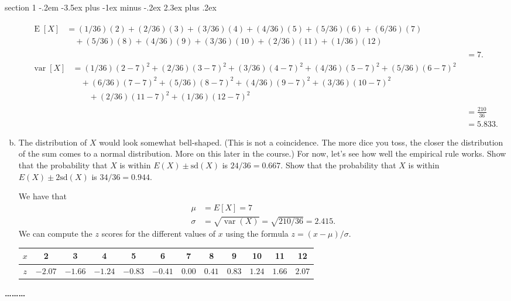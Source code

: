 \documentclass[answers,11pt]{exam}
\makeatletter
\DeclareMathOperator*{\E}{E}
\DeclareMathOperator*{\var}{var}
\newenvironment{problem}{\@startsection
       {section}
       {1}
       {-.2em}
       {-3.5ex plus -1ex minus -.2ex}
       {2.3ex plus .2ex}
       {\pagebreak[3]%
       \large\bf\noindent{Problem }
       }
       }
       {%
       \begin{center}\large\bf \ldots\ldots\ldots\end{center}}
\makeatother
\begin{document}
\begin{problem}{}
\begin{enumerate}[(a)]
\begin{solution}
\begin{align*}
\begin{split}
  \E[X] &= (1/36) (2) + (2/36) (3) + (3/36) (4) + (4/36) (5) + (5/36) (6) + (6/36) (7) \\
        &\quad+ (5/36) (8) + (4/36) (9) + (3/36) (10) + (2/36) (11) + (1/36) (12)
\end{split} \\
        &= 7. \\
\begin{split}
  \var[X] &= (1/36) (2-7)^2 + (2/36) (3-7)^2 + (3/36) (4-7)^2 + (4/36) (5-7)^2
           + (5/36) (6-7)^2 \\
        &\quad+ (6/36) (7-7)^2 + (5/36) (8-7)^2 + (4/36) (9-7)^2 + (3/36) (10-7)^2 \\
        &\quad\quad+ (2/36) (11-7)^2 + (1/36) (12-7)^2
\end{split} \\
        &= \frac{210}{36} \\
        &= 5.833.
\end{align*}
\end{solution}

\item The distribution of $X$ would look somewhat bell-shaped. (This is not a coincidence. The more
dice you toss, the closer the distribution of the sum comes to a normal
distribution. More on this later in the course.) For now, let's see how well
the empirical rule works. Show that the probability that $X$ is within 
$E(X) \pm \mathrm{sd}(X)$ is $24/36=0.667$.  
Show that the probability that $X$ is within $E(X) \pm 2\mathrm{sd}(X)$ is $34/36=0.944$. 
\begin{solution}
We have that
\begin{align*}
  \mu &= E[X] = 7 \\
  \sigma &= \sqrt{\var(X)} 
          = \sqrt{210/36}
          = 2.415.
\end{align*}
We can compute the $z$ scores for the different values of $x$ using the
formula $z = (x - \mu) / \sigma$.

\begin{center}
\begin{tabular}{c|ccccccccccc}
$x$ & 2 & 3 & 4 & 5 & 6 & 7 & 8 & 9 & 10 & 11 & 12 \\
\hline
$z$ & $-2.07$ & $-1.66$ & $-1.24$ & $-0.83$ & $-0.41$ & $0.00$ & $0.41$ & $0.83$ & $1.24$ & $1.66$ & $2.07$
\end{tabular}
\end{center}


\end{solution}
\end{enumerate}
\end{problem}
\end{document}
